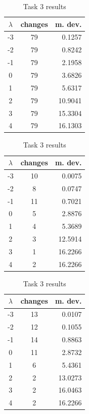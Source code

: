 \begin{table}[!htb]
    \begin{minipage}{.33\linewidth}
        \centering
        \caption{Task 1 results}
        \begin{tabular}{c|cr}
            $\lambda$ & changes & m. dev. \\
            \hline
            -3 & 79 & 0.1257 \\
            -2 & 79 & 0.8242 \\
            -1 & 79 & 2.1958 \\
            0 & 79 & 3.6826 \\
            1 & 79 & 5.6317 \\
            2 & 79 & 10.9041 \\
            3 & 79 & 15.3304 \\
            4 & 79 & 16.1303
        \end{tabular}
    \end{minipage}%
    \begin{minipage}{.33\linewidth}
      \centering
        \caption{Task 2 results}
        \begin{tabular}{c|cr}
            $\lambda$ & changes & m. dev. \\
            \hline
            -3 & 10 & 0.0075 \\
            -2 & 8 & 0.0747 \\
            -1 & 11 & 0.7021 \\
            0 & 5 & 2.8876 \\
            1 & 4 & 5.3689 \\
            2 & 3 & 12.5914 \\
            3 & 1 & 16.2266 \\
            4 & 2 & 16.2266
        \end{tabular}
    \end{minipage}%
    \begin{minipage}{.33\linewidth}
      \centering
        \caption{Task 3 results}
        \begin{tabular}{c|cr}
            $\lambda$ & changes & m. dev. \\
            \hline
            -3 & 13 & 0.0107 \\
            -2 & 12 & 0.1055 \\
            -1 & 14 & 0.8863 \\
            0 & 11 & 2.8732 \\
            1 & 6 & 5.4361 \\
            2 & 2 & 13.0273 \\
            3 & 2 & 16.0463 \\
            4 & 2 & 16.2266
        \end{tabular}
    \end{minipage} 
\end{table}

